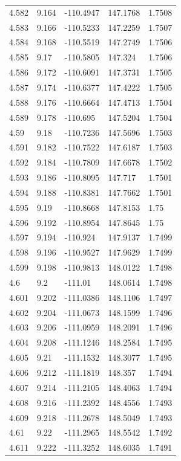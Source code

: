 \begin{tabular}{lllll}
4.582 & 9.164 & -110.4947 & 147.1768 & 1.7508 \\
4.583 & 9.166 & -110.5233 & 147.2259 & 1.7507 \\
4.584 & 9.168 & -110.5519 & 147.2749 & 1.7506 \\
4.585 & 9.17 & -110.5805 & 147.324 & 1.7506 \\
4.586 & 9.172 & -110.6091 & 147.3731 & 1.7505 \\
4.587 & 9.174 & -110.6377 & 147.4222 & 1.7505 \\
4.588 & 9.176 & -110.6664 & 147.4713 & 1.7504 \\
4.589 & 9.178 & -110.695 & 147.5204 & 1.7504 \\
4.59 & 9.18 & -110.7236 & 147.5696 & 1.7503 \\
4.591 & 9.182 & -110.7522 & 147.6187 & 1.7503 \\
4.592 & 9.184 & -110.7809 & 147.6678 & 1.7502 \\
4.593 & 9.186 & -110.8095 & 147.717 & 1.7501 \\
4.594 & 9.188 & -110.8381 & 147.7662 & 1.7501 \\
4.595 & 9.19 & -110.8668 & 147.8153 & 1.75 \\
4.596 & 9.192 & -110.8954 & 147.8645 & 1.75 \\
4.597 & 9.194 & -110.924 & 147.9137 & 1.7499 \\
4.598 & 9.196 & -110.9527 & 147.9629 & 1.7499 \\
4.599 & 9.198 & -110.9813 & 148.0122 & 1.7498 \\
4.6 & 9.2 & -111.01 & 148.0614 & 1.7498 \\
4.601 & 9.202 & -111.0386 & 148.1106 & 1.7497 \\
4.602 & 9.204 & -111.0673 & 148.1599 & 1.7496 \\
4.603 & 9.206 & -111.0959 & 148.2091 & 1.7496 \\
4.604 & 9.208 & -111.1246 & 148.2584 & 1.7495 \\
4.605 & 9.21 & -111.1532 & 148.3077 & 1.7495 \\
4.606 & 9.212 & -111.1819 & 148.357 & 1.7494 \\
4.607 & 9.214 & -111.2105 & 148.4063 & 1.7494 \\
4.608 & 9.216 & -111.2392 & 148.4556 & 1.7493 \\
4.609 & 9.218 & -111.2678 & 148.5049 & 1.7493 \\
4.61 & 9.22 & -111.2965 & 148.5542 & 1.7492 \\
4.611 & 9.222 & -111.3252 & 148.6035 & 1.7491 \\

\end{tabular}
